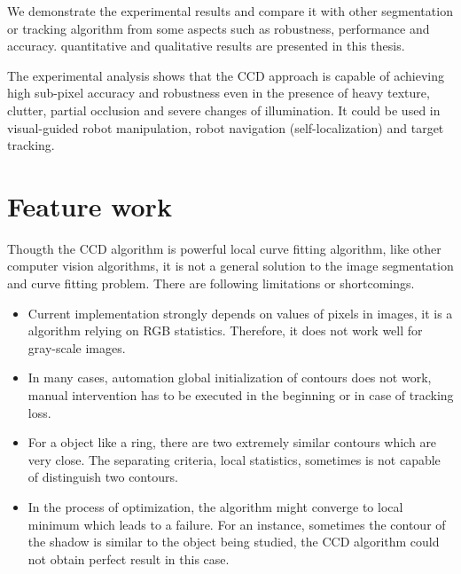 We demonstrate the experimental results and compare it with other
segmentation or tracking algorithm from some aspects such as
robustness, performance and accuracy. quantitative and qualitative
results are presented in this thesis.

The experimental analysis shows that the CCD approach is capable of
achieving high sub-pixel accuracy and robustness even in the presence
of heavy texture, clutter, partial occlusion and severe changes of
illumination. It could be used in  visual-guided robot
manipulation, robot navigation (self-localization) and target
tracking.

\section{Feature work}
\label{sec:feature}

Thougth the CCD algorithm is powerful local curve fitting algorithm,
like other computer vision algorithms, it is not a general solution to
the image segmentation and curve fitting problem. There are following
limitations or shortcomings.
\begin{itemize}
\item Current implementation strongly depends on values of pixels in
  images, it is a algorithm relying on RGB statistics. Therefore, it
  does not work well for gray-scale images.
\item In many cases, automation global initialization of contours does
  not work, manual intervention has to be executed in the beginning or
  in case of tracking loss.
\item For a object like a ring, there are two extremely similar
  contours which are very close. The separating criteria, local
  statistics, sometimes is not capable of distinguish two contours.
\item In the process of optimization, the algorithm might converge to
  local minimum which leads to a failure. For an instance, sometimes the
  contour of the shadow is similar to the object being studied, the
  CCD algorithm could not obtain perfect result in this case.
\end{itemize}


